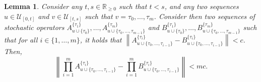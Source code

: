 \documentclass[a4paper,reqno]{amsart}
\newtheorem{lemma}[theorem]{Lemma}
\newcommand{\reals}{\mathbb{R}}
\newcommand{\realsnonneg}{\reals_{\geq 0}}
\newcommand{\norm}[1]{\left\lVert #1 \right\rVert}
\begin{document}
\begin{lemma}\label{lemma:nonmarkov_operator_bound_to_product_bound}
Consider any $t,s\in\realsnonneg$ such that $t<s$, and any two sequences $u\in\mathcal{U}_{[0,t]}$ and $v\in\mathcal{U}_{[t,s]}$ such that $v=\tau_0,\ldots,\tau_m$. Consider then two sequences of stochastic operators $A_{u\cup\{\tau_0\}}^{\{\tau_1\}},\ldots,A_{u\cup\{\tau_0,\ldots,\tau_{m-1}\}}^{\{\tau_m\}}$ and $B_{u\cup\{\tau_0\}}^{\{\tau_1\}},\ldots,B_{u\cup\{\tau_0,\ldots,\tau_{m-1}\}}^{\{\tau_m\}}$ such that for all $i\in\{1,\ldots,m\}$, it holds that $\norm{A_{u\cup\{\tau_0,\ldots,\tau_{i-1}\}}^{\{\tau_i\}} - B_{u\cup\{\tau_0,\ldots,\tau_{i-1}\}}^{\{\tau_i\}}}< c$. Then,
\begin{equation*}
\norm{\prod_{i=1}^m A_{u\cup\{\tau_0,\ldots,\tau_{i-1}\}}^{\{\tau_i\}} - \prod_{i=1}^m B_{u\cup\{\tau_0,\ldots,\tau_{i-1}\}}^{\{\tau_i\}}} < mc.
\end{equation*}
\end{lemma}
\end{document}
